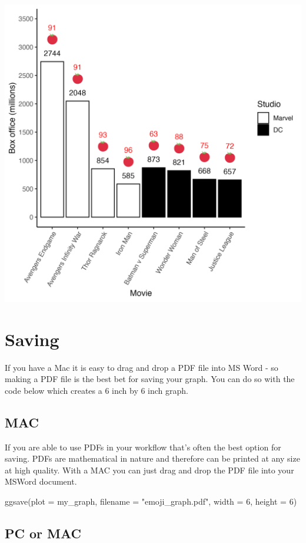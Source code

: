 \documentclass[
]{krantz}
\makeatletter
\newenvironment{Shaded}{\begin{snugshade}}{\end{snugshade}}
\newcommand{\AttributeTok}[1]{\textcolor[rgb]{0.61,0.61,0.61}{#1}}
\newcommand{\DecValTok}[1]{\textcolor[rgb]{0.06,0.06,0.06}{#1}}
\newcommand{\FunctionTok}[1]{\textcolor[rgb]{0,0,0}{#1}}
\newcommand{\NormalTok}[1]{#1}
\newcommand{\StringTok}[1]{\textcolor[rgb]{0.5,0.5,0.5}{#1}}
\newenvironment{kframe}{%
\medskip{}
\setlength{\fboxsep}{.8em}
 \def\at@end@of@kframe{}%
 \ifinner\ifhmode%
  \def\at@end@of@kframe{\end{minipage}}%
  \begin{minipage}{\columnwidth}%
 \fi\fi%
 \def\FrameCommand##1{\hskip\@totalleftmargin \hskip-\fboxsep
 \colorbox{shadecolor}{##1}\hskip-\fboxsep
     \hskip-\linewidth \hskip-\@totalleftmargin \hskip\columnwidth}%
 \MakeFramed {\advance\hsize-\width
   \@totalleftmargin\z@ \linewidth\hsize
   \@setminipage}}%
 {\par\unskip\endMakeFramed%
 \at@end@of@kframe}
\renewenvironment{Shaded}{\begin{kframe}}{\end{kframe}}
\makeatother
\begin{document}
\includegraphics[width=0.65\linewidth]{ch_graphing/images/emoji_graph3}

\hypertarget{saving}{%
\section{Saving}\label{saving}}

If you have a Mac it is easy to drag and drop a PDF file into MS Word - so making a PDF file is the best bet for saving your graph. You can do so with the code below which creates a 6 inch by 6 inch graph.

\hypertarget{mac}{%
\subsection{MAC}\label{mac}}

If you are able to use PDFs in your workflow that's often the best option for saving. PDFs are mathematical in nature and therefore can be printed at any size at high quality. With a MAC you can just drag and drop the PDF file into your MSWord document.

\begin{Shaded}
\begin{Highlighting}[]
\FunctionTok{ggsave}\NormalTok{(}\AttributeTok{plot =}\NormalTok{ my\_graph, }
       \AttributeTok{filename =} \StringTok{"emoji\_graph.pdf"}\NormalTok{, }
       \AttributeTok{width =} \DecValTok{6}\NormalTok{, }
       \AttributeTok{height =} \DecValTok{6}\NormalTok{)}
\end{Highlighting}
\end{Shaded}

\hypertarget{pc-or-mac}{%
\subsection{PC or MAC}\label{pc-or-mac}}
\end{document}
